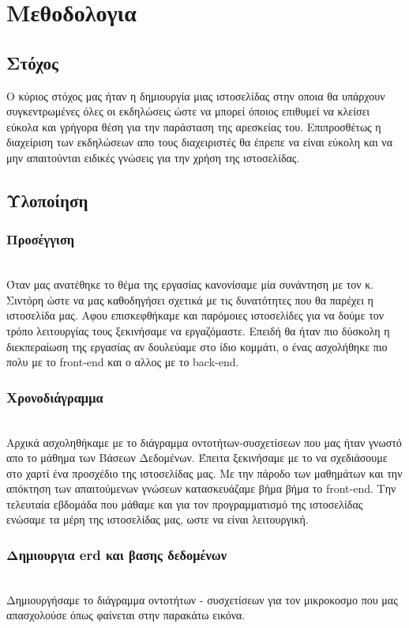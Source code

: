 \documentclass{acmart}
\begin{document}
\section{Μεθοδολογια}
\subsection{Στόχος}
Ο κύριος στόχος μας ήταν η δημιουργία μιας ιστοσελίδας στην οποια θα υπάρχουν συγκεντρωμένες όλες οι εκδηλώσεις ώστε να μπορεί όποιος επιθυμεί να κλείσει εύκολα και γρήγορα θέση για την παράσταση της αρεσκείας του. Επιπροσθέτως η διαχείριση των εκδηλώσεων απο τους διαχειριστές θα έπρεπε να είναι εύκολη και να μην απαιτούνται ειδικές γνώσεις για την χρήση της ιστοσελίδας.

\subsection{Υλοποίηση}
\subsubsection{Προσέγγιση}\hfill\\
Όταν μας ανατέθηκε το θέμα της εργασίας κανονίσαμε μία συνάντηση με τον κ. Σιντόρη ώστε να μας καθοδηγήσει σχετικά με τις δυνατότητες που θα παρέχει η ιστοσελίδα μας. Αφου επισκεφθήκαμε και παρόμοιες ιστοσελίδες για να δούμε τον τρόπο λειτουργίας τους ξεκινήσαμε να εργαζόμαστε. Επειδή θα ήταν πιο δύσκολη η διεκπεραίωση της εργασίας αν δουλεύαμε στο ίδιο κομμάτι, ο ένας ασχολήθηκε πιο πολυ με το front-end και ο αλλος με το back-end.

\subsubsection{Χρονοδιάγραμμα}\hfill\\
Αρχικά ασχοληθήκαμε με το διάγραμμα οντοτήτων-συσχετίσεων που μας ήταν γνωστό απο το μάθημα των Βάσεων Δεδομένων. Έπειτα ξεκινήσαμε με το να σχεδιάσουμε στο χαρτί ένα προσχέδιο της ιστοσελίδας μας. Με την πάροδο των μαθημάτων και την απόκτηση των απαιτούμενων γνώσεων κατασκευάζαμε βήμα βήμα το front-end. Την τελευταία εβδομάδα που μάθαμε και για τον προγραμματισμό της ιστοσελίδας ενώσαμε τα μέρη της ιστοσελίδας μας, ωστε να είναι λειτουργική.

\subsubsection{Δημιουργια erd και βασης δεδομένων}\hfill\\
Δημιουργήσαμε το διάγραμμα οντοτήτων - συσχετίσεων για τον μικροκοσμο που μας απασχολούσε όπως φαίνεται στην παρακάτω εικόνα.
\end{document}
